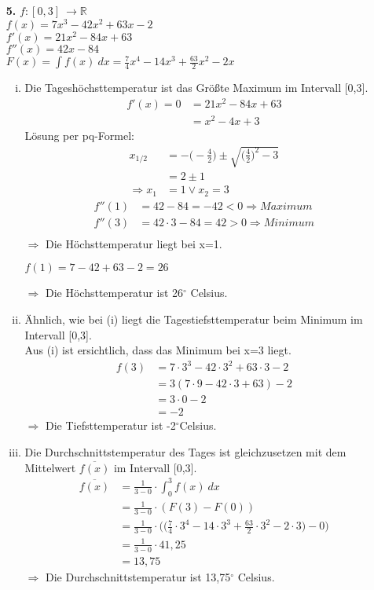 \documentclass[a4paper]{scrartcl}
\begin{document}
\begin{enumerate}
\item[\textbf{5.}]
\(f:[0,3]\ \rightarrow \mathbb{R}\)\\
\(f(x)=7x^3-42x^2+63x-2\)\\
\(f'(x)=21x^2-84x+63\)\\
\(f''(x)=42x-84\)\\
\(F(x) = \int f(x)\ dx= \frac{7}{4}x^4 -14x^3 +\frac{63}{2}x^2-2x\)\\
\begin{enumerate}[(i)]
\item
Die Tageshöchsttemperatur ist das Größte Maximum im Intervall [0,3].\\
\begin{align}
f'(x)=0&=21x^2-84x+63\\
	&=x^2-4x+3
\end{align}
Lösung per pq-Formel:
\begin{align}
x_{1/2} &=-\Big(-\frac{4}{2}\Big)\pm \sqrt{\Big(\frac{4}{2}\Big)^2 -3} \\
	&=2 \pm 1\\
	\Rightarrow x_1&=1 \vee x_2=3
\end{align}
\begin{align}
f''(1) &= 42-84 = -42<0 \Rightarrow Maximum\\
f''(3) &= 42\cdot 3 - 84 =42>0 \Rightarrow Minimum\\
\end{align}
\(\Rightarrow\) Die Höchsttemperatur liegt bei x=1.
\begin{center}
\(f(1)=7-42+63-2=26\)
\end{center}
\(\Rightarrow\) Die Höchsttemperatur ist 26\(^\circ \) Celsius.\\
\item
Ähnlich, wie bei (i) liegt die Tagestiefsttemperatur beim Minimum im Intervall [0,3].\\
Aus (i) ist ersichtlich, dass das Minimum bei x=3 liegt.
\begin{align}
f(3) &= 7\cdot 3^3-42\cdot 3^2 + 63 \cdot 3 -2\\
	&= 3(7\cdot 9 - 42\cdot 3 +63) -2\\
	&= 3 \cdot 0 -2\\
	&= -2
\end{align}
\(\Rightarrow\) Die Tiefsttemperatur ist -2\(^\circ \)Celsius.\\
\item
Die Durchschnittstemperatur des Tages ist gleichzusetzen mit dem Mittelwert \(\overline{f(x)}\) im Intervall [0,3].\\
\begin{align}
\overline{f(x)}&= \frac{1}{3-0} \cdot \int_0^3 f(x)\ dx\\
	&= \frac{1}{3-0} \cdot (F(3)-F(0))\\
	&= \frac{1}{3-0} \cdot \bigg( \Big( \frac{7}{4}\cdot 3^4 -14\cdot 3^3 +\frac{63}{2} \cdot 3^2 -2\cdot 3 \Big) -0 \bigg)\\
	&= \frac{1}{3-0} \cdot 41,25\\
	&= 13,75	
\end{align}
\(\Rightarrow \) Die Durchschnittstemperatur ist 13,75\(^\circ\) Celsius.
\end{enumerate}

\end{enumerate}
\end{document}
